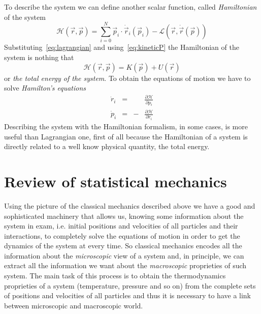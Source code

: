 To describe the system we can define another scalar function, called \textit{Hamiltonian} of the system
\begin{equation*}
	\mathcal{H}(\vec r, \vec p) = \sum_{i=0}^N \vec p_i \cdot \dot{\vec r}_i(\vec p_i) - \mathcal{L}(\vec r, \dot{\vec r}(\vec p))
\end{equation*}
Substituting~\eqref{eq:lagrangian} and using~\eqref{eq:kineticP} the Hamiltonian of the system is nothing that
\begin{equation}
	\mathcal{H}(\vec r, \vec p) = K(\vec p) + U(\vec r)
	\label{eq:hamiltonian}
\end{equation}
or \textit{the total energy of the system}. To obtain the equations of motion we have to solve \textit{Hamilton's equations}
\begin{equation}
	\begin{aligned}
		\dot r_i &=& &\frac{\partial\mathcal{H}}{\partial p_{i}} \\
		\dot p_i &=&-&\frac{\partial\mathcal{H}}{\partial r_{i}}
	\end{aligned}
	\label{eq:eqhamilton}
\end{equation}
Describing the system with the Hamiltonian formalism, in some cases, is more useful than Lagrangian one, first of
all because the Hamiltonian of a system is directly related to a well know physical quantity, the total energy.

\section{Review of statistical mechanics}
\label{sec:statmec}
Using the picture of the classical mechanics described above we have a good and sophisticated machinery that 
allows us, knowing some information about the system in exam, i.e. initial positions and velocities of all 
particles and their interactions, to completely solve the equations of motion in order to get the dynamics of the 
system at every time. So classical mechanics encodes all the information about the \textit{microscopic} view of a 
system and, in principle, we can extract all the information we want about the \textit{macroscopic} proprieties 
of such system. The main task of this process is to obtain the thermodynamics proprieties of a system 
(temperature, pressure and so on) from the complete sets of positions and velocities of all particles and thus it 
is necessary to have a link between microscopic and macroscopic world.

